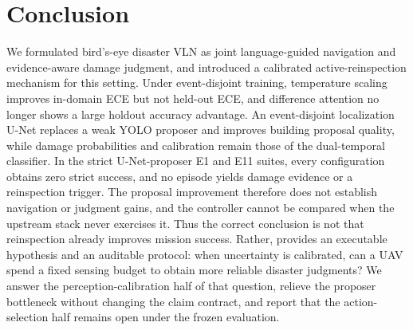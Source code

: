 \section{Conclusion}
\label{sec:conclusion}

We formulated bird's-eye disaster VLN as joint language-guided navigation and evidence-aware damage judgment, and introduced a calibrated active-reinspection mechanism for this setting.
Under event-disjoint training, temperature scaling improves in-domain ECE but not held-out ECE, and difference attention no longer shows a large holdout accuracy advantage.
An event-disjoint localization U-Net replaces a weak YOLO proposer and improves building proposal quality, while damage probabilities and calibration remain those of the dual-temporal classifier.
In the strict U-Net-proposer E1 and E11 suites, every configuration obtains
zero strict success, and no episode yields damage evidence or a reinspection
trigger.
The proposal improvement therefore does not establish navigation or judgment
gains, and the controller cannot be compared when the upstream stack never
exercises it.
Thus the correct conclusion is not that reinspection already improves mission success.
Rather, \ProjectName provides an executable hypothesis and an auditable protocol: when uncertainty is calibrated, can a UAV spend a fixed sensing budget to obtain more reliable disaster judgments?
We answer the perception-calibration half of that question, relieve the proposer bottleneck without changing the claim contract, and report that the action-selection half remains open under the frozen evaluation.
